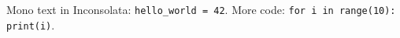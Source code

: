 \documentclass{article}
\begin{document}
Mono text in Inconsolata: \texttt{hello\_world = 42}.
More code: \texttt{for i in range(10): print(i)}.
\end{document}
